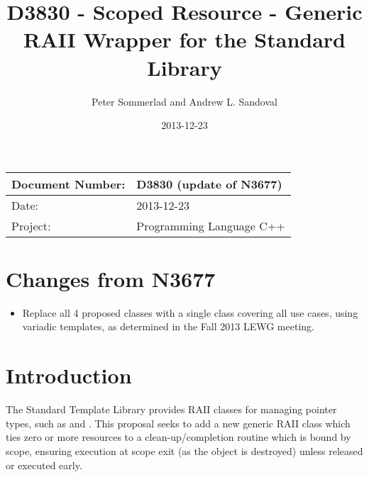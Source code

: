 \documentclass[ebook,11pt,article]{memoir}
\title{D3830 - Scoped Resource - Generic RAII Wrapper for the Standard Library}
\author{Peter Sommerlad and Andrew L. Sandoval}
\date{2013-12-23}                                           %
\begin{document}
\maketitle
\begin{tabular}[t]{|l|l|}\hline 
Document Number: &  D3830 (update of N3677)\\\hline
Date: & 2013-12-23 \\\hline
Project: & Programming Language C++\\\hline 
\end{tabular}

\chapter{Changes from N3677}
\begin{itemize}
\item Replace all 4 proposed classes with a single class covering all use cases, using variadic templates, as determined in the Fall 2013 LEWG meeting.
\end{itemize}

\chapter{Introduction}
The Standard Template Library provides RAII classes for managing pointer types, such as  and .  This proposal seeks to add a new generic RAII class which ties zero or more resources to a clean-up/completion routine which is bound by scope, ensuring execution at scope exit (as the object is destroyed) unless released or executed early.
\end{document}
